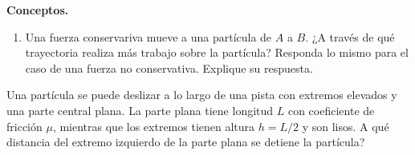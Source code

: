\begin{mdframed}[style=warning]
	\begin{ejercicio}
		\textbf{Conceptos.}
		\begin{enumerate}
			\item Una fuerza conservariva mueve a una partícula de $A$ a $B$. ¿A través de qué trayectoria realiza más trabajo sobre la partícula? Responda lo mismo para el caso de una fuerza no conservativa. Explique su respuesta.
			\begin{center}
				
			\end{center}
		\end{enumerate}
	\end{ejercicio}
\end{mdframed}











\begin{mdframed}[style=warning]
	\begin{ejercicio}
		Una partícula se puede deslizar a lo largo de una pista con extremos elevados y una parte central plana. La parte plana tiene longitud $L$ con coeficiente de fricción $\mu$, mientras que los extremos tienen altura $h = L/2$ y son lisos. A qué distancia del extremo izquierdo de la parte plana se detiene la partícula?
	\end{ejercicio}
\end{mdframed}













